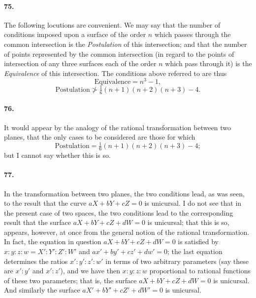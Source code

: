\documentclass[11pt]{article}
\begin{document}
\medskip

\paragraph{75.}
The following locutions are convenient. We may say that the number of
conditions imposed upon a surface of the order $n$ which passes through
the common intersection is the \textit{Postulation} of this intersection;
and that the number of points represented by the common intersection (in
regard to the points of intersection of any three surfaces each of the
order $n$ which pass through it) is the \textit{Equivalence} of this
intersection. The conditions above referred to are thus
\[
\text{Equivalence} = n^{3}-1,
\]
\[
\text{Postulation} \not> \tfrac{1}{6}(n+1)(n+2)(n+3)-4.
\]

\medskip

\paragraph{76.}
It would appear by the analogy of the rational transformation between
two planes, that the only cases to be considered are those for which
\[
\text{Postulation} = \tfrac{1}{6}(n+1)(n+2)(n+3)-4;
\]
but I cannot say whether this is so.

\medskip

\paragraph{77.}
In the transformation between two planes, the two conditions lead, as
was seen, to the result that the curve $aX+bY+cZ=0$ is unicursal. I do
not see that in the present case of two spaces, the two conditions lead
to the corresponding result that the surface $aX+bY+cZ+dW=0$ is
unicursal; that this is so, appears, however, at once from the general
notion of the rational transformation. In fact, the equation in question
$aX+bY+cZ+dW=0$ is satisfied by $x:y:z:w = X':Y':Z':W'$ and
$ax'+by'+cz'+dw'=0$; the last equation determines the ratios
$x':y':z':w'$ in terms of two arbitrary parameters (say these are $x':y'$
and $x':z'$), and we have then $x:y:z:w$ proportional to rational
functions of these two parameters; that is, the surface $aX+bY+cZ+dW=0$
is unicursal. And similarly the surface $aX'+bY'+cZ'+dW'=0$ is unicursal.

\medskip
\end{document}
